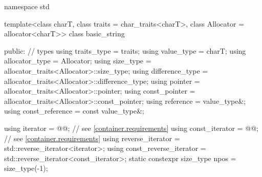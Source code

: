 %
%
%
%
%
%
%
%
%
%
%
%
%
%
\begin{codeblock}
namespace std {
  template<class charT, class traits = char_traits<charT>,
           class Allocator = allocator<charT>>
  class basic_string {
  public:
    // types
    using traits_type            = traits;
    using value_type             = charT;
    using allocator_type         = Allocator;
    using size_type              = allocator_traits<Allocator>::size_type;
    using difference_type        = allocator_traits<Allocator>::difference_type;
    using pointer                = allocator_traits<Allocator>::pointer;
    using const_pointer          = allocator_traits<Allocator>::const_pointer;
    using reference              = value_type&;
    using const_reference        = const value_type&;

    using iterator               = @@; // see \ref{container.requirements}
    using const_iterator         = @@; // see \ref{container.requirements}
    using reverse_iterator       = std::reverse_iterator<iterator>;
    using const_reverse_iterator = std::reverse_iterator<const_iterator>;
    static constexpr size_type npos = size_type(-1);

}}
\end{codeblock}
